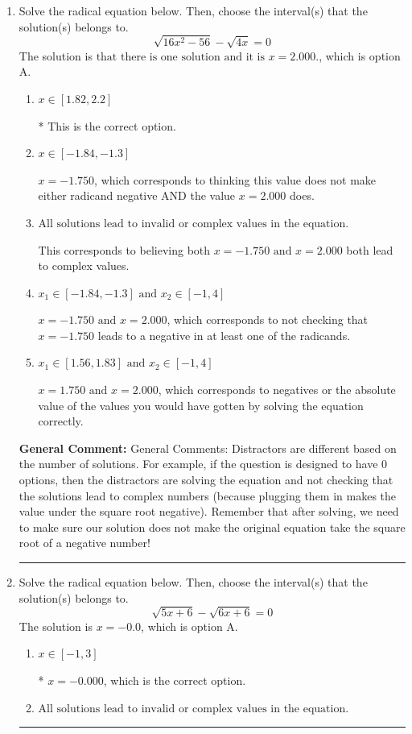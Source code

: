 \documentclass{extbook}[14pt]
\newcommand{\litem}[1]{\item #1

\rule{\textwidth}{0.4pt}}
\begin{document}
\begin{enumerate}\litem{
Solve the radical equation below. Then, choose the interval(s) that the solution(s) belongs to.
\[ \sqrt{16 x^2 - 56} - \sqrt{4 x} = 0 \]
The solution is \( \text{that there is one solution and it is } x = 2.000. \), which is option A.\begin{enumerate}[label=\Alph*.]
\item \( x \in [1.82,2.2] \)

* This is the correct option.
\item \( x \in [-1.84,-1.3] \)

$x = -1.750$, which corresponds to thinking this value does not make either radicand negative AND the value $x = 2.000$ does.
\item \( \text{All solutions lead to invalid or complex values in the equation.} \)

This corresponds to believing both $x = -1.750 \text{ and } x = 2.000$ both lead to complex values.
\item \( x_1 \in [-1.84, -1.3] \text{ and } x_2 \in [-1,4] \)

$x = -1.750 \text{ and } x = 2.000$, which corresponds to not checking that $x = -1.750$ leads to a negative in at least one of the radicands.
\item \( x_1 \in [1.56, 1.83] \text{ and } x_2 \in [-1,4] \)

$x = 1.750 \text{ and } x = 2.000$, which corresponds to negatives or the absolute value of the values you would have gotten by solving the equation correctly.
\end{enumerate}

\textbf{General Comment:} General Comments: Distractors are different based on the number of solutions. For example, if the question is designed to have 0 options, then the distractors are solving the equation and not checking that the solutions lead to complex numbers (because plugging them in makes the value under the square root negative). Remember that after solving, we need to make sure our solution does not make the original equation take the square root of a negative number!
}
\litem{
Solve the radical equation below. Then, choose the interval(s) that the solution(s) belongs to.
\[ \sqrt{5 x + 6} - \sqrt{6 x + 6} = 0 \]
The solution is \( x = -0.0 \), which is option A.\begin{enumerate}[label=\Alph*.]
\item \( x \in [-1,3] \)

* $x = -0.000$, which is the correct option.
\item \( \text{All solutions lead to invalid or complex values in the equation.} \)


\end{enumerate}}
\end{enumerate}
\end{document}
